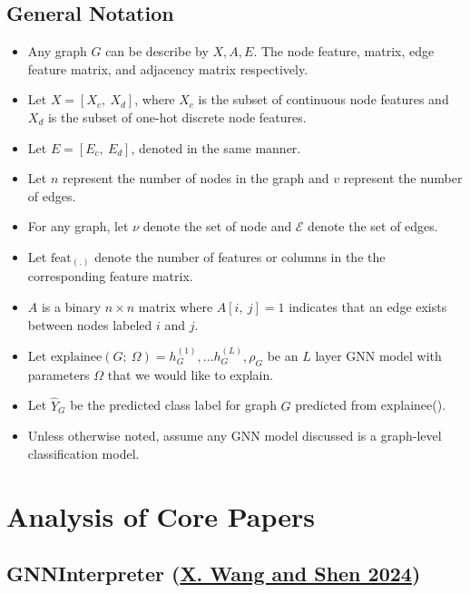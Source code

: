 \documentclass[
  11pt,
  letterpaper,
]{article}
\begin{document}
\hypertarget{general-notation}{%
\subsection{General Notation}\label{general-notation}}

\begin{itemize}
\item
  Any graph \(G\) can be describe by \(X, A, E\). The node feature,
  matrix, edge feature matrix, and adjacency matrix respectively.
\item
  Let \(X = [X_c, \ X_d]\), where \(X_c\) is the subset of continuous
  node features and \(X_d\) is the subset of one-hot discrete node
  features.
\item
  Let \(E = [E_c, \ E_d]\), denoted in the same manner.
\item
  Let \(n\) represent the number of nodes in the graph and \(v\)
  represent the number of edges.
\item
  For any graph, let \(\nu\) denote the set of node and \(\mathcal{E}\)
  denote the set of edges.
\item
  Let \(\text{feat}_{(.)}\) denote the number of features or columns in
  the the corresponding feature matrix.
\item
  \(A\) is a binary \(n \times n\) matrix where \(A[i, \ j] = 1\)
  indicates that an edge exists between nodes labeled \(i\) and \(j\).
\item
  Let
  \(\text{explainee}(G; \ \Omega) = h^{(1)}_G, \dots h^{(L)}_G, \rho_G\)
  be an \(L\) layer GNN model with parameters \(\Omega\) that we would
  like to explain.
\item
  Let \(\hat Y_G\) be the predicted class label for graph \(G\)
  predicted from explainee().
\item
  Unless otherwise noted, assume any GNN model discussed is a
  graph-level classification model.
\end{itemize}

\hypertarget{analysis-of-core-papers}{%
\section{Analysis of Core Papers}\label{analysis-of-core-papers}}

\hypertarget{gnninterpreter-wang_shen_2024}{%
\subsection{\texorpdfstring{GNNInterpreter
(\protect\hyperlink{ref-Wang_Shen_2024}{X. Wang and Shen
2024})}{GNNInterpreter (X. Wang and Shen 2024)}}\label{gnninterpreter-wang_shen_2024}}
\end{document}
